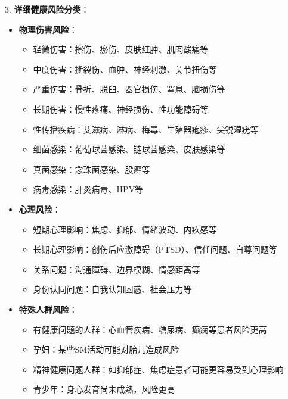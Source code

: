 \documentclass[12pt,UTF8]{ctexbook}
\begin{document}
3. \textbf{详细健康风险分类}：
  \begin{itemize}
  \item \textbf{物理伤害风险}：
    \begin{itemize}
    \item 轻微伤害：擦伤、瘀伤、皮肤红肿、肌肉酸痛等
    \item 中度伤害：撕裂伤、血肿、神经刺激、关节扭伤等
    \item 严重伤害：骨折、脱臼、器官损伤、窒息、脑损伤等
    \item 长期伤害：慢性疼痛、神经损伤、性功能障碍等
    \end{itemize}
    \begin{itemize}
    \item 性传播疾病：艾滋病、淋病、梅毒、生殖器疱疹、尖锐湿疣等
    \item 细菌感染：葡萄球菌感染、链球菌感染、皮肤感染等
    \item 真菌感染：念珠菌感染、股癣等
    \item 病毒感染：肝炎病毒、HPV等
    \end{itemize}
  \item \textbf{心理风险}：
    \begin{itemize}
    \item 短期心理影响：焦虑、抑郁、情绪波动、内疚感等
    \item 长期心理影响：创伤后应激障碍（PTSD）、信任问题、自尊问题等
    \item 关系问题：沟通障碍、边界模糊、情感距离等
    \item 身份认同问题：自我认知困惑、社会压力等
    \end{itemize}
  \item \textbf{特殊人群风险}：
    \begin{itemize}
    \item 有健康问题的人群：心血管疾病、糖尿病、癫痫等患者风险更高
    \item 孕妇：某些SM活动可能对胎儿造成风险
    \item 精神健康问题人群：如抑郁症、焦虑症患者可能更容易受到心理影响
    \item 青少年：身心发育尚未成熟，风险更高
    \end{itemize}
  \end{itemize}
\end{document}
